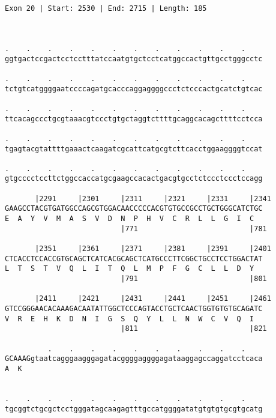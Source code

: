 \documentclass{article}
\begin{document}
\begin{Verbatim}
                                       
 
Exon 20 | Start: 2530 | End: 2715 | Length: 185



.    .    .    .    .    .    .    .    .    .    .    .    
ggtgactccgactcctcctttatccaatgtgctcctcatggccactgttgcctgggcctc
                                                            
.    .    .    .    .    .    .    .    .    .    .    .    
tctgtcatggggaatccccagatgcacccaggaggggccctctcccactgcatctgtcac
                                                            
.    .    .    .    .    .    .    .    .    .    .    .    
ttcacagccctgcgtaaacgtccctgtgctaggtcttttgcaggcacagcttttcctcca
                                                            
.    .    .    .    .    .    .    .    .    .    .    .    
tgagtacgtattttgaaactcaagatcgcattcatgcgtcttcacctggaaggggtccat
                                                            
.    .    .    .    .    .    .    .    .    .    .    .    
gtgcccctccttctggccaccatgcgaagccacactgacgtgcctctccctccctccagg
                                                            
       |2291     |2301     |2311     |2321     |2331     |2341
GAAGCCTACGTGATGGCCAGCGTGGACAACCCCCACGTGTGCCGCCTGCTGGGCATCTGC
E  A  Y  V  M  A  S  V  D  N  P  H  V  C  R  L  L  G  I  C  
                           |771                          |781
  
       |2351     |2361     |2371     |2381     |2391     |2401
CTCACCTCCACCGTGCAGCTCATCACGCAGCTCATGCCCTTCGGCTGCCTCCTGGACTAT
L  T  S  T  V  Q  L  I  T  Q  L  M  P  F  G  C  L  L  D  Y  
                           |791                          |801
  
       |2411     |2421     |2431     |2441     |2451     |2461
GTCCGGGAACACAAAGACAATATTGGCTCCCAGTACCTGCTCAACTGGTGTGTGCAGATC
V  R  E  H  K  D  N  I  G  S  Q  Y  L  L  N  W  C  V  Q  I  
                           |811                          |821
  
          .    .    .    .    .    .    .    .    .    .    
GCAAAGgtaatcagggaagggagatacggggaggggagataaggagccaggatcctcaca
A  K                                                        
                                                            
  
.    .    .    .    .    .    .    .    .    .    .    .    
tgcggtctgcgctcctgggatagcaagagtttgccatggggatatgtgtgtgcgtgcatg
                                                            

\end{Verbatim}
\end{document}
